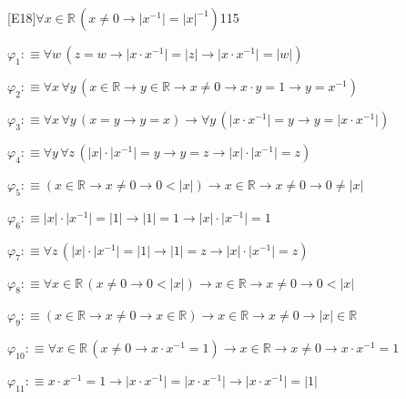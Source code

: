 \begin{fullproof}{[E18]}{$\forall x \in \mathbb{R}\,(x \neq 0 \to \lvert x^{-1} \rvert = \lvert x \rvert^{-1})$}{115}
\begin{ptree}
\noLine
{}
\noLine
{}
\end{ptree}
\begin{abbrevlist}
\item $\varphi_{1} :\equiv \forall w\,(z = w \to \lvert x \cdot x^{-1} \rvert = \lvert z \rvert \to \lvert x \cdot x^{-1} \rvert = \lvert w \rvert)$
\item $\varphi_{2} :\equiv \forall x\,\forall y\,(x \in \mathbb{R} \to y \in \mathbb{R} \to x \neq 0 \to x \cdot y = 1 \to y = x^{-1})$
\item $\varphi_{3} :\equiv \forall x\,\forall y\,(x = y \to y = x) \to \forall y\,(\lvert x \cdot x^{-1} \rvert = y \to y = \lvert x \cdot x^{-1} \rvert)$
\item $\varphi_{4} :\equiv \forall y\,\forall z\,(\lvert x \rvert \cdot \lvert x^{-1} \rvert = y \to y = z \to \lvert x \rvert \cdot \lvert x^{-1} \rvert = z)$
\item $\varphi_{5} :\equiv (x \in \mathbb{R} \to x \neq 0 \to 0 < \lvert x \rvert) \to x \in \mathbb{R} \to x \neq 0 \to 0 \neq \lvert x \rvert$
\item $\varphi_{6} :\equiv \lvert x \rvert \cdot \lvert x^{-1} \rvert = \lvert 1 \rvert \to \lvert 1 \rvert = 1 \to \lvert x \rvert \cdot \lvert x^{-1} \rvert = 1$
\item $\varphi_{7} :\equiv \forall z\,(\lvert x \rvert \cdot \lvert x^{-1} \rvert = \lvert 1 \rvert \to \lvert 1 \rvert = z \to \lvert x \rvert \cdot \lvert x^{-1} \rvert = z)$
\item $\varphi_{8} :\equiv \forall x \in \mathbb{R}\,(x \neq 0 \to 0 < \lvert x \rvert) \to x \in \mathbb{R} \to x \neq 0 \to 0 < \lvert x \rvert$
\item $\varphi_{9} :\equiv (x \in \mathbb{R} \to x \neq 0 \to x \in \mathbb{R}) \to x \in \mathbb{R} \to x \neq 0 \to \lvert x \rvert \in \mathbb{R}$
\item $\varphi_{10} :\equiv \forall x \in \mathbb{R}\,(x \neq 0 \to x \cdot x^{-1} = 1) \to x \in \mathbb{R} \to x \neq 0 \to x \cdot x^{-1} = 1$
\item $\varphi_{11} :\equiv x \cdot x^{-1} = 1 \to \lvert x \cdot x^{-1} \rvert = \lvert x \cdot x^{-1} \rvert \to \lvert x \cdot x^{-1} \rvert = \lvert 1 \rvert$

\end{abbrevlist}
\end{fullproof}
